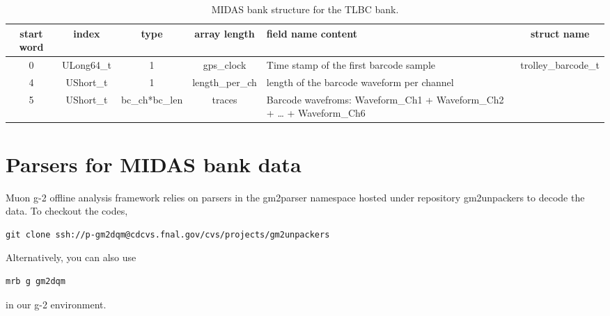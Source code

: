 \begin{table}[htbp]
\centering
\caption{MIDAS bank structure for the TLBC bank.}
\begin{tabular}{|c|c|c|c|p{4cm}|c|}
\hline
start word & index & type & array length & field name	content & struct name \\ 
\hline
0 & ULong64\_t & 1 & gps\_clock & Time stamp of the first barcode sample & \multirow{3}{*}{trolley\_barcode\_t} \\
\hline
4 & UShort\_t & 1 & length\_per\_ch & length of the barcode waveform per channel \\ 
\hline	
5 & UShort\_t	& bc\_ch*bc\_len & traces &	Barcode wavefroms: Waveform\_Ch1 + Waveform\_Ch2 + … + Waveform\_Ch6	 \\
\hline
\end{tabular} 
\label{tab:tlbc}
\end{table}

\section{Parsers for MIDAS bank data}
Muon g-2 offline analysis framework relies on parsers in the gm2parser namespace hosted under repository gm2unpackers to decode the data. To checkout the codes, 

\begin{Verbatim}[frame=single]
git clone ssh://p-gm2dqm@cdcvs.fnal.gov/cvs/projects/gm2unpackers
\end{Verbatim}
%
Alternatively, you can also use 
\begin{Verbatim}[frame=single]
mrb g gm2dqm
\end{Verbatim}
in our g-2 environment.


